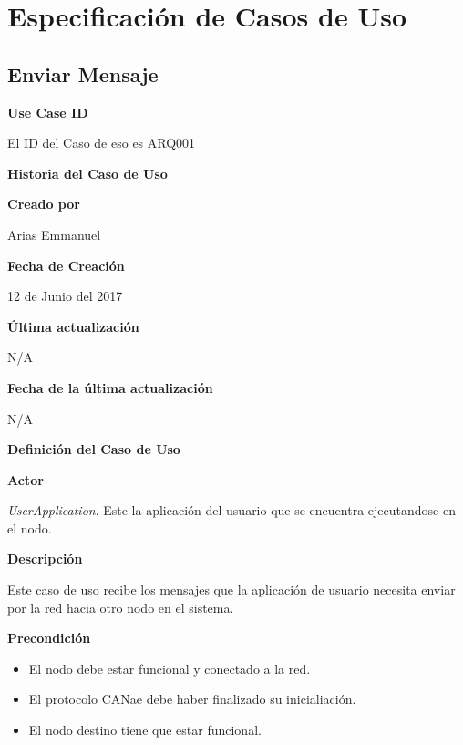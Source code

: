 \chapter{Especificación de Casos de Uso}\label{Appendix:UseCase}


\section{Enviar Mensaje}

\large\textbf{Use Case ID}
\vspace{3mm}

El ID del Caso de eso es ARQ001

\Large\textbf{Historia del Caso de Uso}
\vspace{3mm}

\large\textbf{Creado por}
\vspace{3mm}

Arias Emmanuel

\large\textbf{Fecha de Creación}
\vspace{3mm}

12 de Junio del 2017

\large\textbf{Última actualización}
\vspace{3mm}

N/A

\large\textbf{Fecha de la última actualización}
\vspace{3mm}

N/A


\Large\textbf{Definición del Caso de Uso}
\vspace{3mm}

\large\textbf{Actor}
\vspace{3mm}

\textit{UserApplication}. Este la aplicación del usuario que se encuentra ejecutandose en el nodo.

\large\textbf{Descripción}
\vspace{3mm}

Este caso de uso recibe los mensajes que la aplicación de usuario necesita enviar
por la red hacia otro nodo en el sistema.

\large\textbf{Precondición}
\begin{itemize}
\item El nodo debe estar funcional y conectado a la red.
\item El protocolo CANae debe haber finalizado su inicialiación.
\item El nodo destino tiene que estar funcional.
\end{itemize}

